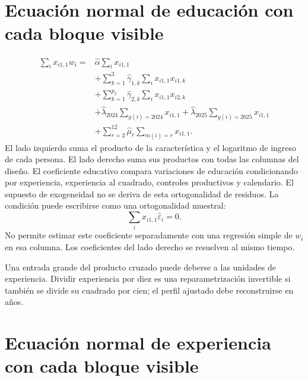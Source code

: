 \documentclass[11pt,a4paper]{article}
\begin{document}
\clearpage
\section{Ecuación normal de educación con cada bloque visible}

\[
\begin{aligned}\sum_i x_{i1,1}w_i={}&\widehat\alpha\sum_ix_{i1,1}\\&+\sum_{k=1}^3\widehat\gamma_{1,k}\sum_ix_{i1,1}x_{i1,k}\\&+\sum_{k=1}^{p_2}\widehat\gamma_{2,k}\sum_ix_{i1,1}x_{i2,k}\\&+\widehat\lambda_{2024}\sum_{y(i)=2024}x_{i1,1}+\widehat\lambda_{2025}\sum_{y(i)=2025}x_{i1,1}\\&+\sum_{r=2}^{12}\widehat\mu_r\sum_{m(i)=r}x_{i1,1}.\end{aligned}
\]
El lado izquierdo suma el producto de la característica y el logaritmo de ingreso de cada persona. El lado derecho suma sus productos con todas las columnas del diseño. El coeficiente educativo compara variaciones de educación condicionando por experiencia, experiencia al cuadrado, controles productivos y calendario. El supuesto de exogeneidad no se deriva de esta ortogonalidad de residuos.
La condición puede escribirse como una ortogonalidad muestral:
\[
\sum_i x_{i1,1}\widehat\varepsilon_i=0.
\]
No permite estimar este coeficiente separadamente con una regresión simple de $w_i$ en esa columna. Los coeficientes del lado derecho se resuelven al mismo tiempo.

Una entrada grande del producto cruzado puede deberse a las unidades de experiencia. Dividir experiencia por diez es una reparametrización invertible si también se divide su cuadrado por cien; el perfil ajustado debe reconstruirse en años.

\clearpage
\section{Ecuación normal de experiencia con cada bloque visible}
\end{document}
